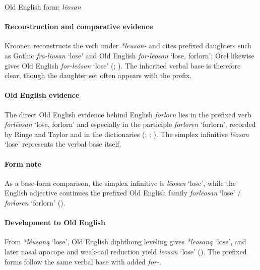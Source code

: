 \documentclass[
  british,
  a4paper,
]{article}
\providecommand{\Recon}[1]{\emph{*#1}}
\begin{document}
Old English form: \emph{lēosan}

\paragraph{Reconstruction and comparative
evidence}\label{reconstruction-and-comparative-evidence-21}

Kroonen reconstructs the verb under \emph{*leusan-} and cites prefixed
daughters such as Gothic \emph{fra-liusan} `lose' and Old English
\emph{for-lēosan} `lose, forlorn'; Orel likewise gives Old English
\emph{for-leósan} `lose' (;
). The inherited verbal base is
therefore clear, though the daughter set often appears with the prefix.

\paragraph{Old English evidence}\label{old-english-evidence-21}

The direct Old English evidence behind English \emph{forlorn} lies in
the prefixed verb \emph{forlēosan} `lose, forlorn' and especially in the
participle \emph{forloren} `forlorn', recorded by Ringe and Taylor and
in the dictionaries (; ;
). The
simplex infinitive \emph{lēosan} `lose' represents the verbal base
itself.

\paragraph{Form note}\label{form-note-2}

As a base-form comparison, the simplex infinitive is \emph{lēosan}
`lose', while the English adjective continues the prefixed Old English
family \emph{forlēosan} `lose' / \emph{forloren} `forlorn'
().

\paragraph{Development to Old
English}\label{development-to-old-english-21}

From \Recon{léusaną} `lose', Old English diphthong leveling gives
\Recon{lēosaną} `lose', and later nasal apocope and weak-tail reduction
yield \emph{lēosan} `lose' (). The prefixed forms follow the same verbal base with added
\emph{for-}.
\end{document}
